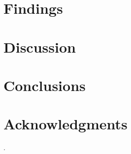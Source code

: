 \documentclass{sig-alternate}
\begin{document}
\section{Findings}
\section{Discussion}
\section{Conclusions}




\section{Acknowledgments} 

.

%

%
%
\end{document}
